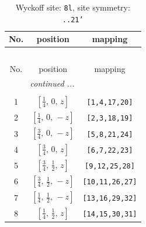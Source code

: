 \documentclass[fleqn,8pt]{jsarticle}
\begin{document}
\begin{longtable}{ccc}
\caption{Wyckoff site: {\tt 8l}, site symmetry: {\tt ..21'}}
 \\
 \hline \hline
No. & position & mapping \\ \hline \endfirsthead

\multicolumn{2}{l}{\tablename\ \thetable{}} \\
 \hline \hline
No. & position & mapping \\ \hline \endhead

 \hline \hline
\multicolumn{2}{r}{\footnotesize\it continued ...} \\ \endfoot

 \hline \hline
\multicolumn{2}{r}{} \\ \endlastfoot

1 & $\left[ \frac{1}{4},\, 0,\, z \right]$ & {\tt [1,4,17,20]} \\ \hline
2 & $\left[ \frac{1}{4},\, 0,\, - z \right]$ & {\tt [2,3,18,19]} \\ \hline
3 & $\left[ \frac{3}{4},\, 0,\, - z \right]$ & {\tt [5,8,21,24]} \\ \hline
4 & $\left[ \frac{3}{4},\, 0,\, z \right]$ & {\tt [6,7,22,23]} \\ \hline
5 & $\left[ \frac{3}{4},\, \frac{1}{2},\, z \right]$ & {\tt [9,12,25,28]} \\ \hline
6 & $\left[ \frac{3}{4},\, \frac{1}{2},\, - z \right]$ & {\tt [10,11,26,27]} \\ \hline
7 & $\left[ \frac{1}{4},\, \frac{1}{2},\, - z \right]$ & {\tt [13,16,29,32]} \\ \hline
8 & $\left[ \frac{1}{4},\, \frac{1}{2},\, z \right]$ & {\tt [14,15,30,31]} \\
\end{longtable}
\renewcommand{\arraystretch}{1.2}
\end{document}
